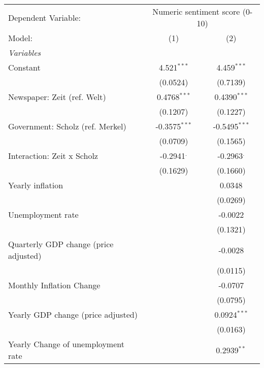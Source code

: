
\begingroup
\centering
\begin{tabular}{lcc}
   \tabularnewline \midrule \midrule
   Dependent Variable: & \multicolumn{2}{c}{Numeric sentiment score (0-10)}\\
   Model:                                & (1)             & (2)\\  
   \midrule
   \emph{Variables}\\
   Constant                              & 4.521$^{***}$   & 4.459$^{***}$\\   
                                         & (0.0524)        & (0.7139)\\   
   Newspaper: Zeit (ref. Welt)           & 0.4768$^{***}$  & 0.4390$^{***}$\\   
                                         & (0.1207)        & (0.1227)\\   
   Government: Scholz (ref. Merkel)      & -0.3575$^{***}$ & -0.5495$^{***}$\\   
                                         & (0.0709)        & (0.1565)\\   
   Interaction: Zeit x Scholz            & -0.2941$^{.}$   & -0.2963$^{.}$\\   
                                         & (0.1629)        & (0.1660)\\   
   Yearly inflation                      &                 & 0.0348\\   
                                         &                 & (0.0269)\\   
   Unemployment rate                     &                 & -0.0022\\   
                                         &                 & (0.1321)\\   
   Quarterly GDP change (price adjusted) &                 & -0.0028\\   
                                         &                 & (0.0115)\\   
   Monthly Inflation Change              &                 & -0.0707\\   
                                         &                 & (0.0795)\\   
   Yearly GDP change (price adjusted)    &                 & 0.0924$^{***}$\\   
                                         &                 & (0.0163)\\   
   Yearly Change of unemployment rate    &                 & 0.2939$^{**}$\\   

\end{tabular}
